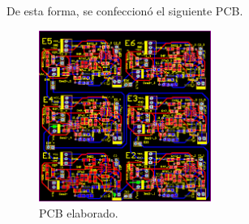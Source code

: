 De esta forma, se confeccionó el siguiente PCB.
\begin{figure}[H]
\centering
	\includegraphics[width=0.5\textwidth]{Imagenes/PCB.png}
	\caption{PCB elaborado.}
\label{fig:pcb}
\end{figure}

